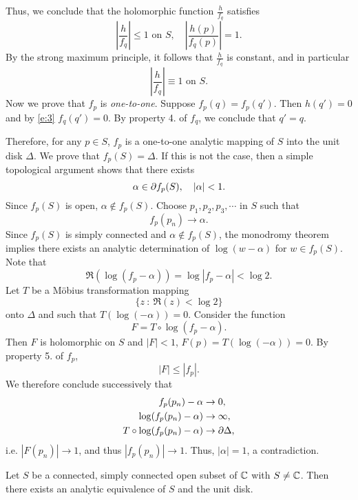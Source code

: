 \documentclass[a4paper,11pt]{article}
\begin{document}
\begin{mdframed}[skipbelow=1ex]
  Thus, we conclude that the holomorphic function $\frac{h}{f_q}$
  satisfies
  $$
  \left|\frac{h}{f_q}\right| \le 1 \text{ on } S,\quad
  \left|\frac{h(p)}{f_q(p)}\right| = 1.
  $$
  By the strong maximum principle, it follows that $\frac{h}{f_q}$ is
  constant, and in particular
  \begin{equation}
    \label{e:3}
    \left|\frac{h}{f_q}\right| \equiv 1 \text{ on } S.
  \end{equation}
  Now we prove that $f_p$ is \emph{one-to-one}.  Suppose $f_p(q) =
  f_p(q')$.  Then $h(q') = 0$ and by \eqref{e:3} $f_q(q') = 0$.  By
  property 4. of $f_q$, we conclude that $q' = q$.

  Therefore, for any $p \in S$, $f_p$ is a one-to-one analytic mapping
  of $S$ into the unit disk $\Delta$.  We prove that $f_p(S) =
  \Delta$.  If this is not the case, then a simple topological
  argument shows that there exists
  $$
  \alpha \in \partial f_p(S),\quad |\alpha| < 1.
  $$
  Since $f_p(S)$ is open, $\alpha \notin f_p(S)$.  Choose $p_1, p_2,
  p_3, \cdots$ in $S$ such that
  $$
  f_p(p_n) \to \alpha.
  $$
  Since $f_p(S)$ is simply connected and $\alpha \notin f_p(S)$, the
  monodromy theorem implies there exists an analytic determination of
  $\log(w - \alpha)$ for $w \in f_p(S)$.  Note that
  $$
  \Re(\log(f_p - \alpha)) = \log|f_p - \alpha| < \log 2.
  $$
  Let $T$ be a M\"obius transformation mapping
  $$
  \{z ~:~ \Re(z) < \log2\}
  $$
  onto $\Delta$ and such that $T(\log(-\alpha)) = 0$.  Consider the
  function
  $$
  F = T \circ \log(f_p - \alpha).
  $$
  Then $F$ is holomorphic on $S$ and $|F| < 1$, $F(p) =
  T(\log(-\alpha)) = 0$.  By property 5. of $f_p$,
  $$
  |F| \le |f_p|.
  $$
  We therefore conclude successively that
  $$
  \begin{aligned}
    f_p(p_n) - \alpha &\to 0,\\
    \log(f_p(p_n) - \alpha) &\to \infty,\\
    T\circ \log(f_p(p_n) - \alpha) &\to \partial \Delta,
  \end{aligned}
  $$
  i.e. $|F(p_n)| \to 1$, and thus $|f_p(p_n)| \to 1$.
  Thus, $|\alpha| = 1$, a contradiction.
\end{mdframed}

\begin{cor}
  Let $S$ be a connected, simply connected open subset of ${\mathbb C}$ with
  $S \ne {\mathbb C}$.  Then there exists an analytic equivalence of $S$ and
  the unit disk.
\end{cor}
\end{document}
